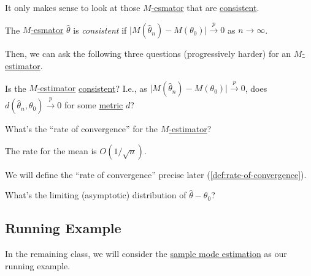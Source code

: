 It only makes sense to look at those \hyperref[prb:M-estimation]{\(M\)-esmator} that are \hyperref[def:consistent]{consistent}.

\begin{definition}[Consistent]\label{def:consistent}
	The \hyperref[prb:M-estimation]{\(M\)-esmator} \(\hat{\theta} \) is \emph{consistent} if \(\vert M(\hat{\theta} _n) - M(\theta _0) \vert \overset{p}{\to } 0\) as \(n\to \infty \).
\end{definition}

Then, we can ask the following three questions (progressively harder) for an \hyperref[prb:M-estimation]{\(M\)-estimator}.

\begin{problem}[Consistency]\label{prb:consistency}
Is the \hyperref[prb:M-estimation]{\(M\)-estimator} \hyperref[def:consistent]{consistent}? I.e., as \(\vert M(\hat{\theta} _n) - M(\theta _0) \vert \overset{p}{\to } 0\), does \(d(\hat{\theta} _n, \theta _0) \overset{p}{\to } 0\) for some \hyperref[def:pseudo-metric]{metric} \(d\)?
\end{problem}

\begin{problem}\label{prb:rate-of-convergence}
What's the ``rate of convergence'' for the \hyperref[prb:M-estimation]{\(M\)-estimator}?
\end{problem}

\begin{eg}
	The rate for the mean is \(O(1 / \sqrt{n} )\).
\end{eg}

We will define the ``rate of convergence'' precise later (\autoref{def:rate-of-convergence}).

\begin{problem}\label{prb:limiting-distribution}
What's the limiting (asymptotic) distribution of \(\hat{\theta} - \theta _0\)?
\end{problem}

\subsection{Running Example}
In the remaining class, we will consider the \hyperref[eg:mode-estimation]{sample mode estimation} as our running example.

